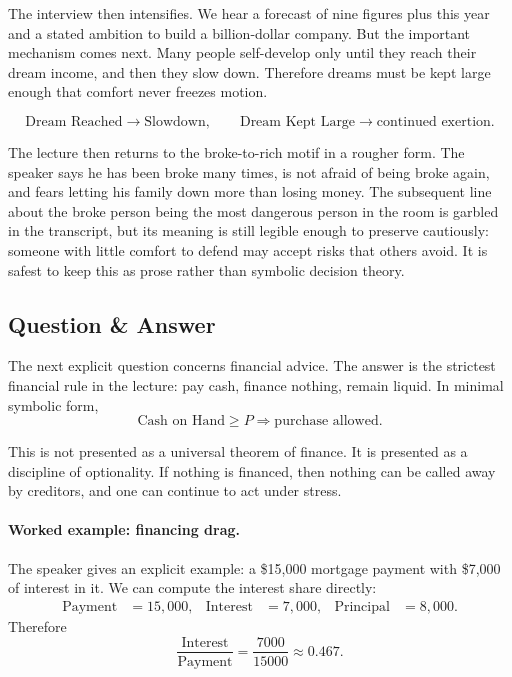 The interview then intensifies. We hear a forecast of nine figures plus this year and a stated ambition to build a billion-dollar company. But the important mechanism comes next. Many people self-develop only until they reach their dream income, and then they slow down. Therefore dreams must be kept large enough that comfort never freezes motion.

\begin{equation}
\text{Dream Reached} \to \text{Slowdown},
\qquad
\text{Dream Kept Large} \to \text{continued exertion}.
\end{equation}

The lecture then returns to the broke-to-rich motif in a rougher form. The speaker says he has been broke many times, is not afraid of being broke again, and fears letting his family down more than losing money. The subsequent line about the broke person being the most dangerous person in the room is garbled in the transcript, but its meaning is still legible enough to preserve cautiously: someone with little comfort to defend may accept risks that others avoid. It is safest to keep this as prose rather than symbolic decision theory.

\subsection{Question \& Answer}

The next explicit question concerns financial advice. The answer is the strictest financial rule in the lecture: pay cash, finance nothing, remain liquid. In minimal symbolic form,
\begin{equation}
\text{Cash on Hand} \ge P \Rightarrow \text{purchase allowed}.
\end{equation}

This is not presented as a universal theorem of finance. It is presented as a discipline of optionality. If nothing is financed, then nothing can be called away by creditors, and one can continue to act under stress.

\paragraph{Worked example: financing drag.}
The speaker gives an explicit example: a \$15{,}000 mortgage payment with \$7{,}000 of interest in it. We can compute the interest share directly:
\begin{align}
\text{Payment} &= 15{,}000, &
\text{Interest} &= 7{,}000, &
\text{Principal} &= 8{,}000.
\end{align}
Therefore
\begin{equation}
\frac{\text{Interest}}{\text{Payment}}
=
\frac{7000}{15000}
\approx 0.467.
\end{equation}

